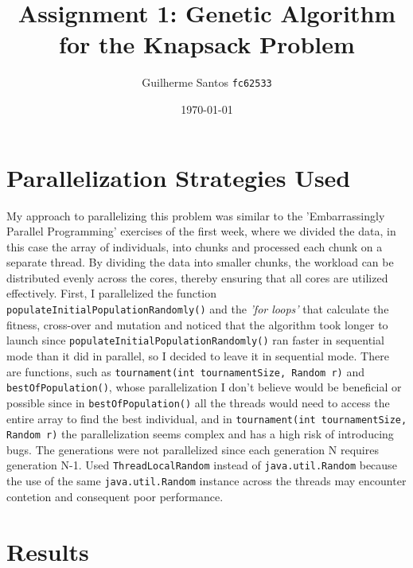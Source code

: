\documentclass[11pt]{report}
\title{Assignment 1: Genetic Algorithm for the Knapsack Problem}
\author{Guilherme Santos \texttt{fc62533}}
\date{\today}
\begin{document}
\maketitle

\section*{Parallelization Strategies Used}
My approach to parallelizing this problem was similar to the
'Embarrassingly Parallel Programming' exercises of the first week, where we divided the data, in this case the array of individuals, into chunks and processed each chunk on a separate thread.
By dividing the data into smaller chunks, the workload can be distributed evenly across the cores, thereby ensuring that all cores are utilized effectively.
First, I parallelized the function \texttt{populateInitialPopulationRandomly()} and the \textit{'for loops'} that calculate the fitness, cross-over and mutation and noticed that the algorithm took longer to launch since \texttt{populateInitialPopulationRandomly()} ran faster in sequential mode than it did in parallel, 
so I decided to leave it in sequential mode.
There are functions, such as \texttt{tournament(int tournamentSize, Random r)} and \texttt{bestOfPopulation()}, whose parallelization I don't believe would be beneficial 
or possible since in \texttt{bestOfPopulation()} all the threads would need to access the entire array to find the best individual, 
and in \texttt{tournament(int tournamentSize, Random r)} the parallelization seems complex and has a high risk of introducing bugs.
The generations were not parallelized since each generation N requires generation N-1.
Used \texttt{ThreadLocalRandom} instead of \texttt{java.util.Random} because the use of the same \texttt{java.util.Random} instance across the threads may encounter contetion and consequent poor performance.
\section*{Results}
\end{document}
